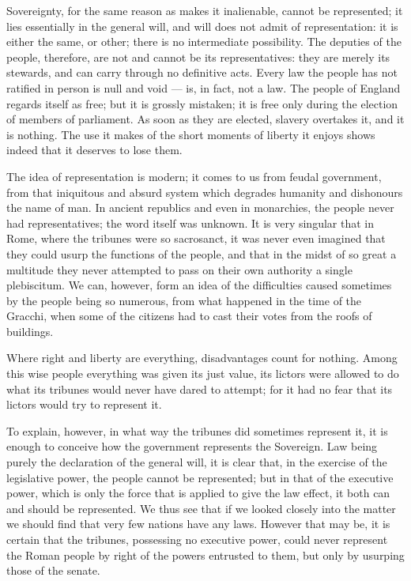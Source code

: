 \documentclass[12pt]{report}
\begin{document}
Sovereignty, for the same reason as makes it inalienable, cannot be represented; it lies essentially in the general will, and will does not admit of representation: it is either the same, or other; there is no intermediate possibility. The deputies of the people, therefore, are not and cannot be its representatives: they are merely its stewards, and can carry through no definitive acts. Every law the people has not ratified in person is null and void — is, in fact, not a law. The people of England regards itself as free; but it is grossly mistaken; it is free only during the election of members of parliament. As soon as they are elected, slavery overtakes it, and it is nothing. The use it makes of the short moments of liberty it enjoys shows indeed that it deserves to lose them.

The idea of representation is modern; it comes to us from feudal government, from that iniquitous and absurd system which degrades humanity and dishonours the name of man. In ancient republics and even in monarchies, the people never had representatives; the word itself was unknown. It is very singular that in Rome, where the tribunes were so sacrosanct, it was never even imagined that they could usurp the functions of the people, and that in the midst of so great a multitude they never attempted to pass on their own authority a single plebiscitum. We can, however, form an idea of the difficulties caused sometimes by the people being so numerous, from what happened in the time of the Gracchi, when some of the citizens had to cast their votes from the roofs of buildings.

Where right and liberty are everything, disadvantages count for nothing. Among this wise people everything was given its just value, its lictors were allowed to do what its tribunes would never have dared to attempt; for it had no fear that its lictors would try to represent it.

To explain, however, in what way the tribunes did sometimes represent it, it is enough to conceive how the government represents the Sovereign. Law being purely the declaration of the general will, it is clear that, in the exercise of the legislative power, the people cannot be represented; but in that of the executive power, which is only the force that is applied to give the law effect, it both can and should be represented. We thus see that if we looked closely into the matter we should find that very few nations have any laws. However that may be, it is certain that the tribunes, possessing no executive power, could never represent the Roman people by right of the powers entrusted to them, but only by usurping those of the senate.
\end{document}
